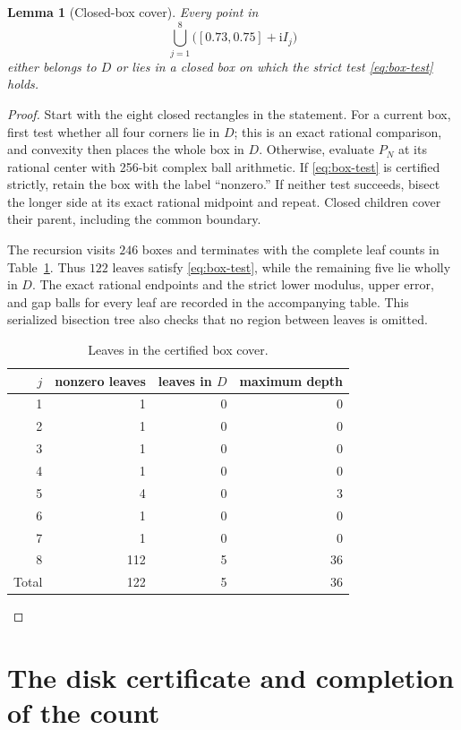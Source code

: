 \documentclass[11pt]{article}
\newtheorem{lemma}[theorem]{Lemma}
\theoremstyle{remark}
\newcommand{\ii}{\mathrm{i}}
\begin{document}
\begin{lemma}[Closed-box cover]\label{lem:box-cover}
Every point in
\[
 \bigcup_{j=1}^8\bigl([0.73,0.75]+\ii I_j\bigr)
\]
either belongs to $D$ or lies in a closed box on which the strict test
\eqref{eq:box-test} holds.
\end{lemma}

\begin{proof}
Start with the eight closed rectangles in the statement.  For a current box,
first test whether all four corners lie in $D$; this is an exact rational
comparison, and convexity then places the whole box in $D$.  Otherwise,
evaluate $P_N$ at its rational center with 256-bit complex ball arithmetic.
If \eqref{eq:box-test} is certified strictly, retain the box with the label
``nonzero.''  If neither test succeeds, bisect the longer side at its exact
rational midpoint and repeat.  Closed children cover their parent, including
the common boundary.

The recursion visits $246$ boxes and terminates with the complete leaf counts
in Table~\ref{tab:leaf-counts}.  Thus $122$ leaves satisfy
\eqref{eq:box-test}, while the remaining five lie wholly in $D$.  The exact
rational endpoints and the strict lower modulus, upper error, and gap balls
for every leaf are recorded in the accompanying table.  This serialized
bisection tree also checks that no region between leaves is omitted.

\begin{table}[ht]
\centering
\caption{Leaves in the certified box cover.}
\label{tab:leaf-counts}
\begin{tabular}{rrrr}
\toprule
$j$ & nonzero leaves & leaves in $D$ & maximum depth\\
\midrule
1&1&0&0\\
2&1&0&0\\
3&1&0&0\\
4&1&0&0\\
5&4&0&3\\
6&1&0&0\\
7&1&0&0\\
8&112&5&36\\
\midrule
Total&122&5&36\\
\bottomrule
\end{tabular}
\end{table}
\end{proof}

\section{The disk certificate and completion of the count}
\end{document}
